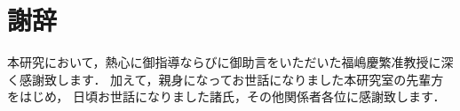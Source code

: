 \chapter*{謝辞}

本研究において，熱心に御指導ならびに御助言をいただいた福嶋慶繁准教授に深く感謝致します．
加えて，親身になってお世話になりました本研究室の先輩方をはじめ，
日頃お世話になりました諸氏，その他関係者各位に感謝致します．
